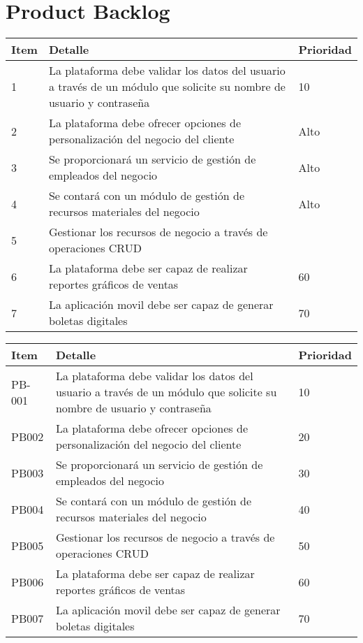 \chapter{Product Backlog}

\begin{table}[htbp]
	\begin{center}
		\begin{tabular}{|p{0.8cm} | p{12cm} | p{2cm} |}
			\hline
			Item & Detalle & Prioridad \\
			\hline
			1 & La plataforma debe validar los datos del usuario a través de un módulo que solicite su nombre de usuario y contraseña & 10 \\
			\hline
			2 & La plataforma debe ofrecer opciones de personalización del negocio del cliente & Alto  \\
			\hline
			3 & Se proporcionará un servicio de gestión de empleados del negocio & Alto  \\
			\hline
			4 & Se contará con un módulo de gestión de recursos materiales del negocio & Alto  \\
			\hline
			5 & Gestionar los recursos de negocio a través de operaciones CRUD &  \\
			\hline	
			6 & La plataforma debe ser capaz de realizar reportes gráficos de ventas & 60 \\
			\hline
			7 & La aplicación movil debe ser capaz de generar boletas digitales & 70 \\
		\end{tabular}
	\end{center}
\end{table}

\begin{table}[htbp]
	\begin{center}
		\begin{tabular}{|p{1.2cm} | p{12cm} | p{2cm} |}
			\hline
			Item & Detalle & Prioridad \\
			\hline
			PB-001 & La plataforma debe validar los datos del usuario a través de un módulo que solicite su nombre de usuario y contraseña & 10 \\
			\hline
			PB002 & La plataforma debe ofrecer opciones de personalización del negocio del cliente & 20  \\
			\hline
			PB003 & Se proporcionará un servicio de gestión de empleados del negocio & 30  \\
			\hline
			PB004 & Se contará con un módulo de gestión de recursos materiales del negocio & 40 \\
			\hline
			PB005 & Gestionar los recursos de negocio a través de operaciones CRUD & 50 \\
			\hline	
			PB006 & La plataforma debe ser capaz de realizar reportes gráficos de ventas & 60 \\
			\hline
			PB007 & La aplicación movil debe ser capaz de generar boletas digitales & 70 \\
			\hline
		\end{tabular}
	\end{center}
\end{table}
